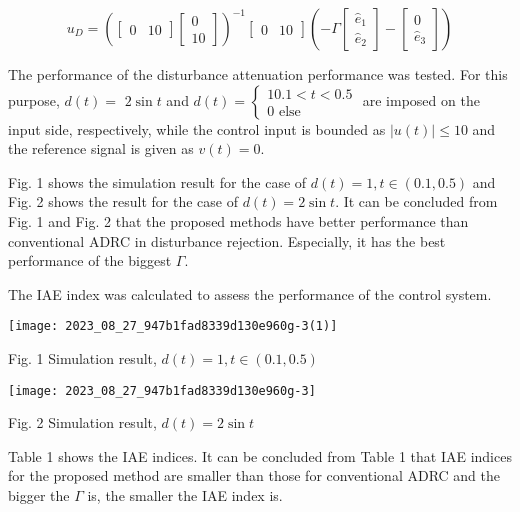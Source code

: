 \documentclass[10pt]{article}
\begin{document}
$$
u_{D}=\left(\left[\begin{array}{ll}
0 & 10
\end{array}\right]\left[\begin{array}{c}
0 \\
10
\end{array}\right]\right)^{-1}\left[\begin{array}{ll}
0 & 10
\end{array}\right]\left(-\Gamma\left[\begin{array}{c}
\hat{e}_{1} \\
\hat{e}_{2}
\end{array}\right]-\left[\begin{array}{c}
0 \\
\hat{e}_{3}
\end{array}\right]\right)
$$

The performance of the disturbance attenuation performance was tested. For this purpose, $d(t)=$ $2 \sin t$ and $d(t)=\left\{\begin{array}{c}10.1<t<0.5 \\ 0 \text { else }\end{array}\right.$ are imposed on the input side, respectively, while the control input is bounded as $|u(t)| \leq 10$ and the reference signal is given as $v(t)=0$.

Fig. 1 shows the simulation result for the case of $d(t)=1, t \in(0.1,0.5)$ and Fig. 2 shows the result for the case of $d(t)=2 \sin t$. It can be concluded from Fig. 1 and Fig. 2 that the proposed methods have better performance than conventional ADRC in disturbance rejection. Especially, it has the best performance of the biggest $\Gamma$.

The IAE index was calculated to assess the performance of the control system.

\begin{center}
\texttt{[image: 2023\_08\_27\_947b1fad8339d130e960g-3(1)]}
\end{center}

Fig. 1 Simulation result, $d(t)=1, t \in(0.1,0.5)$

\begin{center}
\texttt{[image: 2023\_08\_27\_947b1fad8339d130e960g-3]}
\end{center}

Fig. 2 Simulation result, $d(t)=2 \sin t$

Table 1 shows the IAE indices. It can be concluded from Table 1 that IAE indices for the proposed method are smaller than those for conventional ADRC and the bigger the $\Gamma$ is, the smaller the IAE index is.
\end{document}
